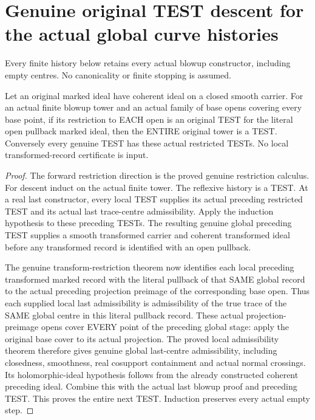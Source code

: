 \section{Genuine original TEST descent for the actual global curve histories}

Every finite history below retains every actual blowup constructor,
including empty centres. No canonicality or finite stopping is assumed.

\begin{lemma}
\label{hir:sharp-actual-curve-global-test-open-cover-descent}
\leanok
Let an original marked ideal have coherent ideal on a closed smooth
carrier. For an actual finite blowup tower and an actual family of base
opens covering every base point, if its restriction to EACH open is an
original TEST for the literal open pullback marked ideal, then the ENTIRE
original tower is a TEST. Conversely every genuine TEST has these actual
restricted TESTs. No local transformed-record certificate is input.
\end{lemma}
\begin{proof}
The forward restriction direction is the proved genuine restriction
calculus. For descent induct on the actual finite tower. The reflexive
history is a TEST. At a real last constructor, every local TEST supplies
its actual preceding restricted TEST and its actual last trace-centre
admissibility. Apply the induction hypothesis to these preceding TESTs.
The resulting genuine global preceding TEST supplies a smooth transformed
carrier and coherent transformed ideal before any transformed record is
identified with an open pullback.

The genuine transform-restriction theorem now identifies each local
preceding transformed marked record with the literal pullback of that
SAME global record to the actual preceding projection preimage of the
corresponding base open. Thus each supplied local last admissibility is
admissibility of the true trace of the SAME global centre in this literal
pullback record. These actual projection-preimage opens cover EVERY point
of the preceding global stage: apply the original base cover to its actual
projection. The proved local admissibility theorem therefore gives genuine
global last-centre admissibility, including closedness, smoothness, real
cosupport containment and actual normal crossings. Its holomorphic-ideal
hypothesis follows from the already constructed coherent preceding ideal.
Combine this with the actual last blowup proof and preceding TEST. This
proves the entire next TEST. Induction preserves every actual empty step.
\end{proof}

